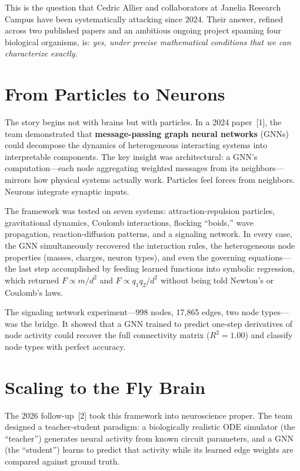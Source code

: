 \documentclass[11pt,twocolumn]{article}
\begin{document}
This is the question that Cedric Allier and collaborators at Janelia Research Campus have been systematically attacking since 2024. Their answer, refined across two published papers and an ambitious ongoing project spanning four biological organisms, is: \emph{yes, under precise mathematical conditions that we can characterize exactly.}

\section{From Particles to Neurons}

The story begins not with brains but with particles. In a 2024 paper~[1], the team demonstrated that \textbf{message-passing graph neural networks} (GNNs) could decompose the dynamics of heterogeneous interacting systems into interpretable components. The key insight was architectural: a GNN's computation---each node aggregating weighted messages from its neighbors---mirrors how physical systems actually work. Particles feel forces from neighbors. Neurons integrate synaptic inputs.

The framework was tested on seven systems: attraction-repulsion particles, gravitational dynamics, Coulomb interactions, flocking ``boids,'' wave propagation, reaction-diffusion patterns, and a signaling network. In every case, the GNN simultaneously recovered the interaction rules, the heterogeneous node properties (masses, charges, neuron types), and even the governing equations---the last step accomplished by feeding learned functions into symbolic regression, which returned $F \propto m/d^2$ and $F \propto q_1 q_2 / d^2$ without being told Newton's or Coulomb's laws.

The signaling network experiment---998 nodes, 17,865 edges, two node types---was the bridge. It showed that a GNN trained to predict one-step derivatives of node activity could recover the full connectivity matrix ($R^2 = 1.00$) and classify node types with perfect accuracy.

\section{Scaling to the Fly Brain}

The 2026 follow-up~[2] took this framework into neuroscience proper. The team designed a teacher-student paradigm: a biologically realistic ODE simulator (the ``teacher'') generates neural activity from known circuit parameters, and a GNN (the ``student'') learns to predict that activity while its learned edge weights are compared against ground truth.
\end{document}
